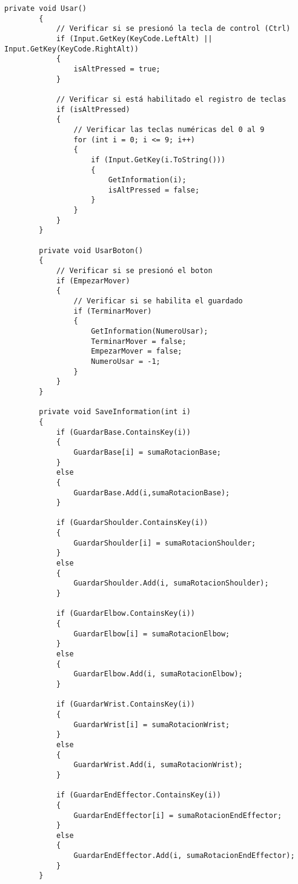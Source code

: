 \begin{lstlisting}[frame=single]
        private void Usar()
        {
            // Verificar si se presionó la tecla de control (Ctrl)
            if (Input.GetKey(KeyCode.LeftAlt) || Input.GetKey(KeyCode.RightAlt))
            {
                isAltPressed = true;
            }

            // Verificar si está habilitado el registro de teclas
            if (isAltPressed)
            {
                // Verificar las teclas numéricas del 0 al 9
                for (int i = 0; i <= 9; i++)
                {
                    if (Input.GetKey(i.ToString()))
                    {
                        GetInformation(i);
                        isAltPressed = false;
                    }
                }
            }
        }

        private void UsarBoton()
        {
            // Verificar si se presionó el boton
            if (EmpezarMover)
            {
                // Verificar si se habilita el guardado
                if (TerminarMover)
                {
                    GetInformation(NumeroUsar);
                    TerminarMover = false;
                    EmpezarMover = false;
                    NumeroUsar = -1;
                }
            }
        }

        private void SaveInformation(int i)
        {
            if (GuardarBase.ContainsKey(i))
            {
                GuardarBase[i] = sumaRotacionBase;
            }
            else
            {
                GuardarBase.Add(i,sumaRotacionBase);
            }

            if (GuardarShoulder.ContainsKey(i))
            {
                GuardarShoulder[i] = sumaRotacionShoulder;
            }
            else
            {
                GuardarShoulder.Add(i, sumaRotacionShoulder);
            }

            if (GuardarElbow.ContainsKey(i))
            {
                GuardarElbow[i] = sumaRotacionElbow;
            }
            else
            {
                GuardarElbow.Add(i, sumaRotacionElbow);
            }

            if (GuardarWrist.ContainsKey(i))
            {
                GuardarWrist[i] = sumaRotacionWrist;
            }
            else
            {
                GuardarWrist.Add(i, sumaRotacionWrist);
            }

            if (GuardarEndEffector.ContainsKey(i))
            {
                GuardarEndEffector[i] = sumaRotacionEndEffector;
            }
            else
            {
                GuardarEndEffector.Add(i, sumaRotacionEndEffector);
            }
        }


\end{lstlisting}
